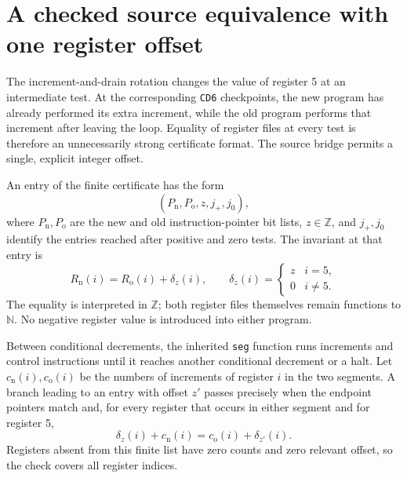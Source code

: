 \section{A checked source equivalence with one register offset}
\label{sec:offset-bisimulation}

The increment-and-drain rotation changes the value of register 5 at an
intermediate test. At the corresponding \texttt{CD6} checkpoints, the new
program has already performed its extra increment, while the old program
performs that increment after leaving the loop. Equality of register files
at every test is therefore an unnecessarily strong certificate format.
The source bridge permits a single, explicit integer offset.

An entry of the finite certificate has the form
\[
  (P_{\mathrm{n}},P_{\mathrm{o}},z,j_+,j_0),
\]
where \(P_{\mathrm{n}},P_{\mathrm{o}}\) are the new and old instruction-pointer bit
lists, \(z\in\mathbb Z\), and \(j_+,j_0\) identify the entries reached
after positive and zero tests. The invariant at that entry is
\begin{equation}
  R_{\mathrm{n}}(i)=R_{\mathrm{o}}(i)+\delta_z(i),
  \qquad
  \delta_z(i)=\begin{cases}z&i=5,\\0&i\ne5.\end{cases}
  \label{eq:register-offset}
\end{equation}
The equality is interpreted in \(\mathbb Z\); both register files
themselves remain functions to \(\mathbb N\). No negative register value
is introduced into either program.

Between conditional decrements, the inherited \texttt{seg} function runs
increments and control instructions until it reaches another conditional
decrement or a halt. Let \(c_{\mathrm{n}}(i),c_{\mathrm{o}}(i)\) be the numbers of
increments of register \(i\) in the two segments. A branch leading to an
entry with offset \(z'\) passes precisely when the endpoint pointers match
and, for every register that occurs in either segment and for register 5,
\begin{equation}
  \delta_z(i)+c_{\mathrm{n}}(i)
       =c_{\mathrm{o}}(i)+\delta_{z'}(i).
  \label{eq:offset-counts}
\end{equation}
Registers absent from this finite list have zero counts and zero relevant
offset, so the check covers all register indices.

